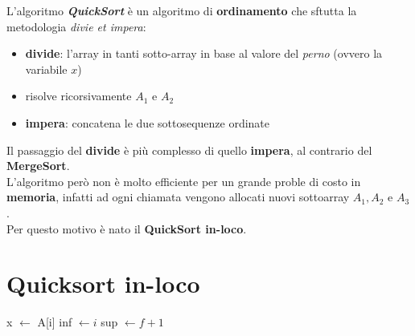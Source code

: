 \documentclass{article}
\begin{document}
L'algoritmo \textbf{\textit{QuickSort}} è un algoritmo di \textbf{ordinamento}
che sftutta la metodologia \textit{divie et impera}:

\begin{itemize}
  \item \textbf{divide}: l'array in tanti sotto-array in base al valore del 
  \textit{perno} (ovvero la variabile $x$)
  \item risolve ricorsivamente $A_1$ e $A_2$ 
  \item \textbf{impera}: concatena le due sottosequenze ordinate
\end{itemize}

Il passaggio del \textbf{divide} è più complesso di 
quello \textbf{impera}, al contrario del \textbf{MergeSort}. \\
L'algoritmo però non è molto efficiente per un grande proble di costo in 
\textbf{memoria}, infatti ad ogni chiamata vengono allocati nuovi sottoarray
$A_1, A_2$ e $A_3$. \\
Per questo motivo è nato il \textbf{QuickSort in-loco}.

\section*{Quicksort in-loco}

\vspace{0.3cm}


\begin{algorithm}[H]
\renewcommand{\thealgocf}{}
\caption{Ordina l'array, versione in-loco}


\BlankLine

 {

  x $\leftarrow$ A[i]\;
  inf $\leftarrow i$\;
  sup $\leftarrow f + 1$\;

  \BlankLine

}

\end{algorithm}
\vspace{0.3cm}
\end{document}
